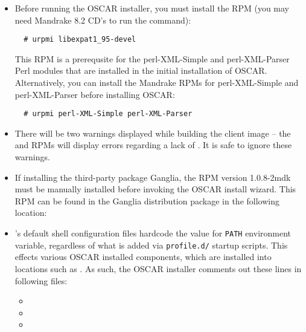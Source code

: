 \begin{itemize}
\item Before running the OSCAR installer, you must install the
   RPM (you may need Mandrake 8.2 CD's to run
  the  command):

\begin{verbatim}
  # urpmi libexpat1_95-devel
\end{verbatim}

  This RPM is a prerequsite for the perl-XML-Simple and
  perl-XML-Parser Perl modules that are installed in the initial
  installation of OSCAR.  Alternatively, you can install the Mandrake
  RPMs for perl-XML-Simple and perl-XML-Parser before installing
  OSCAR:

\begin{verbatim}
  # urpmi perl-XML-Simple perl-XML-Parser
\end{verbatim}

\item There will be two warnings displayed while building the client
  image -- the  and  RPMs will
  display errors regarding a lack of .  It is safe
  to ignore these warnings.
  
\item If installing the third-party package Ganglia, the
   RPM version 1.0.8-2mdk must be manually installed
  before invoking the OSCAR install wizard.  This RPM can be
  found in the Ganglia distribution package in the following location:\\
  
\item {}'s default shell configuration files hardcode the
  value for {\tt PATH} environment variable, regardless of what is
  added via {\tt profile.d/} startup scripts.  This effects various
  OSCAR installed components, which are installed into locations such
  as .  As such, the OSCAR installer comments out these
  lines in following files:

  \begin{itemize}
  \item {}
  \item {}
  \item {}
  \end{itemize}

\end{itemize}

